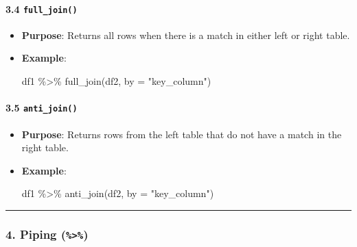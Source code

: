 \documentclass[
  letterpaper,
  DIV=11,
  numbers=noendperiod]{scrartcl}
\let\oldparagraph\paragraph
\renewcommand{\paragraph}[1]{\oldparagraph{#1}\mbox{}}
\newenvironment{Shaded}{\begin{snugshade}}{\end{snugshade}}
\newcommand{\AttributeTok}[1]{\textcolor[rgb]{0.40,0.45,0.13}{#1}}
\newcommand{\FunctionTok}[1]{\textcolor[rgb]{0.28,0.35,0.67}{#1}}
\newcommand{\NormalTok}[1]{\textcolor[rgb]{0.00,0.23,0.31}{#1}}
\newcommand{\SpecialCharTok}[1]{\textcolor[rgb]{0.37,0.37,0.37}{#1}}
\newcommand{\StringTok}[1]{\textcolor[rgb]{0.13,0.47,0.30}{#1}}
\begin{document}
\paragraph{\texorpdfstring{\textbf{3.4
\texttt{full\_join()}}}{3.4 full\_join()}}\label{full_join}

\begin{itemize}
\item
  \textbf{Purpose}: Returns all rows when there is a match in either
  left or right table.
\item
  \textbf{Example}:

\begin{Shaded}
\begin{Highlighting}[]
\NormalTok{df1 }\SpecialCharTok{\%\textgreater{}\%} \FunctionTok{full\_join}\NormalTok{(df2, }\AttributeTok{by =} \StringTok{"key\_column"}\NormalTok{)}
\end{Highlighting}
\end{Shaded}
\end{itemize}

\paragraph{\texorpdfstring{\textbf{3.5
\texttt{anti\_join()}}}{3.5 anti\_join()}}\label{anti_join}

\begin{itemize}
\item
  \textbf{Purpose}: Returns rows from the left table that do not have a
  match in the right table.
\item
  \textbf{Example}:

\begin{Shaded}
\begin{Highlighting}[]
\NormalTok{df1 }\SpecialCharTok{\%\textgreater{}\%} \FunctionTok{anti\_join}\NormalTok{(df2, }\AttributeTok{by =} \StringTok{"key\_column"}\NormalTok{)}
\end{Highlighting}
\end{Shaded}
\end{itemize}

\begin{center}\rule{0.5\linewidth}{0.5pt}\end{center}

\subsubsection{\texorpdfstring{4. \textbf{Piping
(\texttt{\%\textgreater{}\%})}}{4. Piping (\%\textgreater\%)}}\label{piping}
\end{document}
